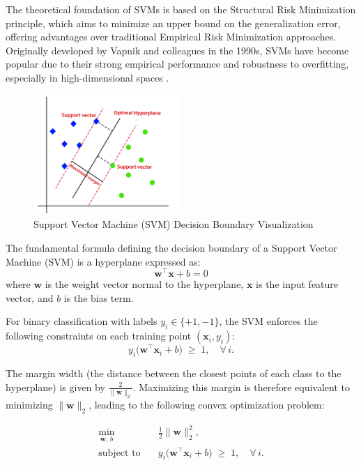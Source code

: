 The theoretical foundation of SVMs is based on the Structural Risk Minimization principle, which aims to minimize an upper bound on the generalization error, offering advantages over traditional Empirical Risk Minimization approaches. Originally developed by Vapnik and colleagues in the 1990s, SVMs have become popular due to their strong empirical performance and robustness to overfitting, especially in high-dimensional spaces \cite{Gunn1998SupportVM}.
\begin{figure}[H]
  \centering
  \includegraphics[width=0.5\textwidth]{Images/Chapter1/svm.png}
  \caption{Support Vector Machine (SVM) Decision Boundary Visualization}
  \label{fig:svm}
\end{figure}
The fundamental formula defining the decision boundary of a Support Vector Machine (SVM) is a hyperplane expressed as:
\begin{equation}
  \mathbf{w}^\top \mathbf{x} + b = 0
\end{equation}
where $\mathbf{w}$ is the weight vector normal to the hyperplane, $\mathbf{x}$ is the input feature vector, and $b$ is the bias term.

For binary classification with labels $y_i \in \{+1, -1\}$, the SVM enforces the following constraints on each training point $(\mathbf{x}_i, y_i)$:
\begin{equation}
  y_i \bigl(\mathbf{w}^\top \mathbf{x}_i + b\bigr) \;\ge\; 1,
  \quad \forall\,i.
\end{equation}

The margin width (the distance between the closest points of each class to the hyperplane) is given by $\tfrac{2}{\|\mathbf{w}\|_2}$.  Maximizing this margin is therefore equivalent to minimizing $\|\mathbf{w}\|_2$, leading to the following convex optimization problem:

\begin{align}
  \min_{\mathbf{w},\,b} \quad & \frac{1}{2} \|\mathbf{w}\|_2^2,                             \\
  \text{subject to} \quad     & y_i \bigl(\mathbf{w}^\top \mathbf{x}_i + b\bigr) \;\ge\; 1,
  \quad \forall\,i.
\end{align}
